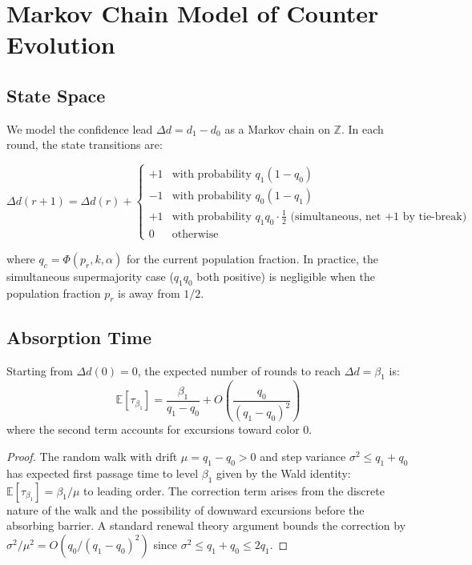 \section{Markov Chain Model of Counter Evolution}

\label{sec:wave-markov}

\subsection{State Space}

We model the confidence lead $\Delta d = d_1 - d_0$ as a Markov chain on $\mathbb{Z}$.
In each round, the state transitions are:

\begin{equation}
\Delta d(r+1) = \Delta d(r) + \begin{cases}
+1 & \text{with probability } q_1(1 - q_0) \\
-1 & \text{with probability } q_0(1 - q_1) \\
+1 & \text{with probability } q_1 q_0 \cdot \frac{1}{2} \text{ (simultaneous, net +1 by tie-break)} \\
0 & \text{otherwise}
\end{cases}
\label{eq:wave-markov}
\end{equation}

where $q_c = \Phi(p_r, k, \alpha)$ for the current population fraction. In practice,
the simultaneous supermajority case ($q_1 q_0$ both positive) is negligible when the
population fraction $p_r$ is away from $1/2$.

\subsection{Absorption Time}

\begin{lemma}
\label{lem:wave-absorption}
Starting from $\Delta d(0) = 0$, the expected number of rounds to reach $\Delta d = \beta_1$
is:
\[
\mathbb{E}[\tau_{\beta_1}] = \frac{\beta_1}{q_1 - q_0} + O\left(\frac{q_0}{(q_1 - q_0)^2}\right)
\]
where the second term accounts for excursions toward color 0.
\end{lemma}

\begin{proof}
The random walk with drift $\mu = q_1 - q_0 > 0$ and step variance $\sigma^2 \leq q_1 + q_0$
has expected first passage time to level $\beta_1$ given by the Wald identity:
$\mathbb{E}[\tau_{\beta_1}] = \beta_1 / \mu$ to leading order. The correction term
arises from the discrete nature of the walk and the possibility of downward excursions
before the absorbing barrier. A standard renewal theory argument bounds the correction
by $\sigma^2/\mu^2 = O(q_0/(q_1 - q_0)^2)$ since $\sigma^2 \leq q_1 + q_0 \leq 2q_1$.
\end{proof}

